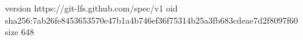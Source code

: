 version https://git-lfs.github.com/spec/v1
oid sha256:7ab26fe8453653570e47b1a4b746ef36f75314b25a3fb683cdeae7d2f8097f60
size 648
